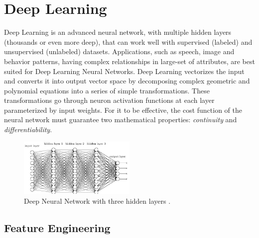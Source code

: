 \documentclass[sigconf]{acmart}
\begin{document}
	\section{Deep Learning}
	
	Deep Learning is an advanced neural network, with multiple hidden layers (thousands or even more deep), that can work well with supervised (labeled) and unsupervised (unlabeled) datasets. Applications, such as speech, image and behavior patterns, having complex relationships in large-set of attributes, are best suited for Deep Learning Neural Networks. Deep Learning vectorizes the input and converts it into output vector space by decomposing complex geometric and polynomial equations into a series of simple transformations. These transformations go through neuron activation functions at each layer parameterized by input weights. For it to be effective, the cost function of the neural network must guarantee two mathematical properties: {\em continuity} and {\em differentiability}.
	
	\begin{figure}
		\centering
		\includegraphics[width=0.5\textwidth]{images/deepnetwork}
		\caption{Deep Neural Network with three hidden layers \cite{Goodfellow2016}.} \label{fig:figure2} 
	\end{figure}

	\subsection{Feature Engineering}
	
\end{document}
